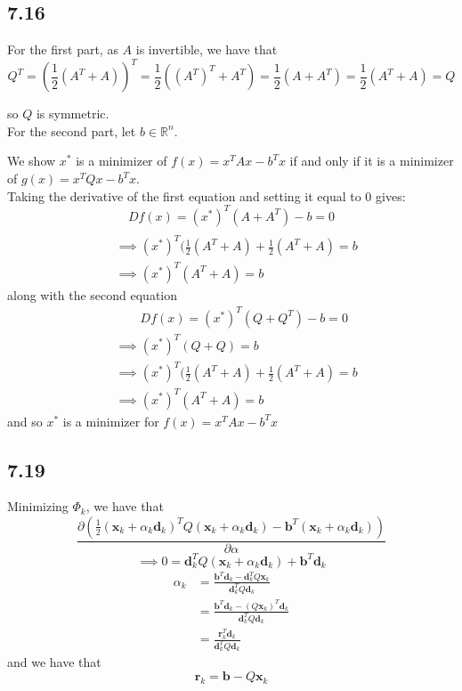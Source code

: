 \documentclass[letterpaper,12pt]{article}
\theoremstyle{definition}
\begin{document}
\subsection*{7.16}

For the first part, as $A$ is invertible, we have that\\
\[Q^T = (\frac{1}{2}(A^T + A))^T = \frac{1}{2}((A^T)^T + A^T) =  \frac{1}{2}(A + A^T) = \frac{1}{2}(A^T + A) = Q\]

so $Q$ is symmetric.\\
 
For the second part, let $b \in \mathbb{R}^n$.

We show $x^*$ is a minimizer of $f(x) = x^TAx - b^Tx$ if and only if it is a minimizer of $g(x) = x^TQx - b^Tx$.\\

Taking the derivative of the first equation and setting it equal to 0 gives:\\

\[Df(x) = ( x^*)^T(A + A^T) - b = 0\]
\begin{align*}
\\&\implies ( x^*)^T( \frac{1}{2}(A^T + A) +  \frac{1}{2}(A^T + A) = b
\\&\implies ( x^*)^T(A^T + A)= b
\end{align*}
along with the second equation
\begin{align*}
& \qquad Df(x) = ( x^*)^T(Q + Q^T) - b = 0
\\&\implies ( x^*)^T(Q + Q) = b 
\\&\implies( x^*)^T( \frac{1}{2}(A^T + A) +  \frac{1}{2}(A^T + A) = b
\\&\implies( x^*)^T(A^T + A)= b
\end{align*}
and so $x^*$ is a minimizer for $f(x) = x^TAx - b^Tx$





\subsection*{7.19}
Minimizing $\Phi_k$, we have that  
\[
\frac{\partial\left(\frac{1}{2}(\mathbf{x}_k+\alpha_k\mathbf{d}_k)^T Q(\mathbf{x}_k+\alpha_k\mathbf{d}_k)- \mathbf{b}^T(\mathbf{x}_k+\alpha_k\mathbf{d}_k)\right)}{\partial\alpha}
\]
\[ \implies 0 = \mathbf{d}_k^T Q(\mathbf{x}_k+\alpha_k\mathbf{d}_k)+\mathbf{b}^T\mathbf{d}_k \]
\begin{align*}
\alpha_k &= \frac{\mathbf{b}^T\mathbf{d}_k - \mathbf{d}_k^T Q\mathbf{x}_k}{\mathbf{d}_k^T Q\mathbf{d}_k}\\
&= \frac{\mathbf{b}^T\mathbf{d}_k - (Q\mathbf{x}_k)^T\mathbf{d}_k}{\mathbf{d}_k^T Q\mathbf{d}_k} 
\\&= \frac{\mathbf{r}_k^T\mathbf{d}_k}{\mathbf{d}_k^T Q\mathbf{d}_k}
\end{align*}
and we have that
\[\mathbf{r}_k = \mathbf{b}-Q\mathbf{x}_k\]
\end{document}

